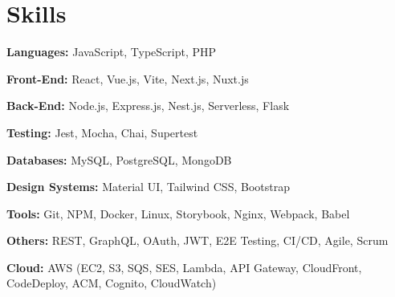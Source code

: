 \documentclass[letterpaper,12pt]{article}
\newcommand{\resumeSubHeadingListStart}{\begin{itemize}[leftmargin=0.15in, label={}]}
\newcommand{\resumeSubHeadingListEnd}{\end{itemize}}
\begin{document}
\section{Skills}
\vspace{2pt}
\resumeSubHeadingListStart
\small{\item{

                \textbf{Languages:}{ JavaScript, TypeScript, PHP} \\ \vspace{3pt}

                \textbf{Front-End:}{ React, Vue.js, Vite, Next.js, Nuxt.js} \\ \vspace{3pt}

                \textbf{Back-End:}{ Node.js, Express.js, Nest.js, Serverless, Flask} \\ \vspace{3pt}

                \textbf{Testing:}{ Jest, Mocha, Chai, Supertest} \\ \vspace{3pt}

                \textbf{Databases:}{ MySQL, PostgreSQL, MongoDB} \\ \vspace{3pt}

                \textbf{Design Systems:}{ Material UI, Tailwind CSS, Bootstrap} \\ \vspace{3pt}

                \textbf{Tools:}{ Git, NPM, Docker, Linux, Storybook, Nginx, Webpack, Babel} \\ \vspace{3pt}

                \textbf{Others:}{ REST, GraphQL, OAuth, JWT, E2E Testing, CI/CD, Agile, Scrum} \\ \vspace{3pt}

                \textbf{Cloud:}{ AWS (EC2, S3, SQS, SES, Lambda, API Gateway, CloudFront, CodeDeploy, ACM, Cognito, CloudWatch)} \\ \vspace{3pt}
          }}
\resumeSubHeadingListEnd

\end{document}
